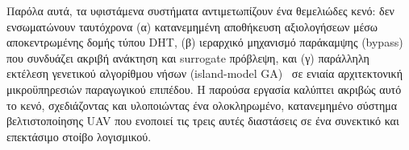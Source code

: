 Παρόλα αυτά, τα υφιστάμενα συστήματα αντιμετωπίζουν ένα θεμελιώδες κενό: δεν ενσωματώνουν ταυτόχρονα (α) κατανεμημένη αποθήκευση αξιολογήσεων μέσω αποκεντρωμένης δομής τύπου DHT, (β) ιεραρχικό μηχανισμό παράκαμψης (bypass) που συνδυάζει ακριβή ανάκτηση και surrogate πρόβλεψη, και (γ) παράλληλη εκτέλεση γενετικού αλγορίθμου νήσων (island-model GA)~\cite{whitley1999island} σε ενιαία αρχιτεκτονική μικροϋπηρεσιών παραγωγικού επιπέδου. Η παρούσα εργασία καλύπτει ακριβώς αυτό το κενό, σχεδιάζοντας και υλοποιώντας ένα ολοκληρωμένο, κατανεμημένο σύστημα βελτιστοποίησης UAV που ενοποιεί τις τρεις αυτές διαστάσεις σε ένα συνεκτικό και επεκτάσιμο στοίβο λογισμικού.

